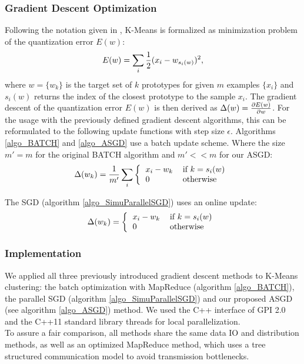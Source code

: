 \documentclass{acm_proc_article-sp}
\begin{document}
\subsubsection*{Gradient Descent Optimization}
Following the notation given in \cite{bottou1994convergence}, K-Means is 
formalized as minimization problem of the quantization error $E(w)$: 
\begin{equation}
E(w)=\sum_i{1\over 2}(x_i-w_{s_i(w)})^2,
\label{eq_kmeans}
\end{equation} 
where $w=\{w_k\}$ is the target set of $k$ prototypes for given $m$ examples 
$\{x_i\}$ and $s_i(w)$ returns the index of the closest prototype to the sample 
$x_i$.
The gradient descent of the quantization error $E(w)$ is then derived as 
$\Delta(w)={\partial E(w)\over \partial w}$. For the usage with the 
previously defined gradient descent algorithms, 
this can be reformulated to the following update
functions with step size $\epsilon$. 
Algorithms \ref{algo_BATCH} and \ref{algo_ASGD} use a batch update scheme.
Where the size $m' = m$ for the original BATCH algorithm and $m' << m$ for 
our ASGD:
\begin{equation}
\Delta(w_k)={1\over m'}\sum_i\left\{
\begin{tabular}{ll}
  $x_i-w_k$ & if $k=s_i(w)$ \\
  $0$ & otherwise 
\end{tabular}
\right.
\label{eq_km_batch}
\end{equation}

The SGD (algorithm \ref{algo_SimuParallelSGD}) uses an online update:
\begin{equation}
\Delta(w_k)=\left\{
\begin{tabular}{ll}
  $x_i-w_k$ & if $k=s_i(w)$ \\
  $0$ & otherwise 
\end{tabular}
\right.
\label{eq_km_online}
\end{equation}

\subsubsection*{Implementation}
We applied all three previously introduced gradient descent methods to 
K-Means clustering: the batch optimization with 
MapReduce
\cite{chu2007map} (algorithm \ref{algo_BATCH}), 
the parallel SGD \cite{SGDsmola} (algorithm \ref{algo_SimuParallelSGD})
 and our proposed ASGD (see algorithm \ref{algo_ASGD}) 
method. We used the C++ interface of GPI 2.0 \cite{grunewald2013gaspi} 
and the C++11
standard library threads for local parallelization.\\
To assure a fair comparison, all methods share the same data IO and distribution 
methods, as well as an optimized MapReduce method, which uses a tree 
structured communication model to avoid transmission bottlenecks.   
\end{document}

